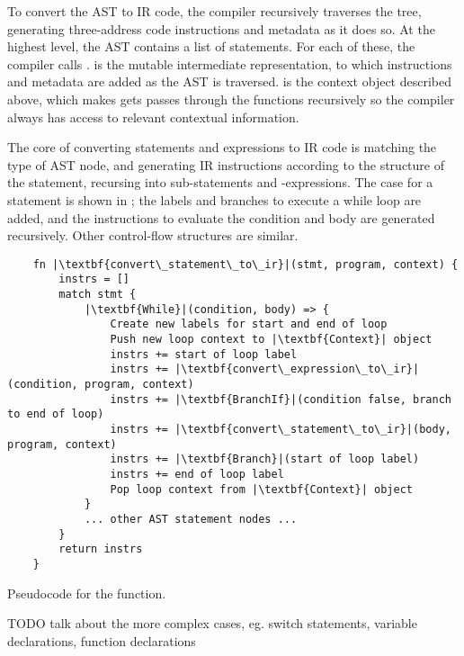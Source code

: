 \documentclass[00-main.tex]{subfiles}
\begin{document}
To convert the AST to IR code, the compiler recursively traverses the tree, generating three-address code instructions and metadata as it does so.
At the highest level, the AST contains a list of statements.
For each of these, the compiler calls .
 is the mutable intermediate representation, to which instructions and metadata are added as the AST is traversed.
 is the context object described above, which makes gets passes through the functions recursively so the compiler always has access to relevant contextual information.

The core of converting statements and expressions to IR code is matching the type of AST node, and generating IR instructions according to the structure of the statement, recursing into sub-statements and -expressions.
The case for a  statement is shown in ; the labels and branches to execute a while loop are added, and the instructions to evaluate the condition and body are generated recursively.
Other control-flow structures are similar.

\begin{listing}[!ht]
  \begin{verbatim}
    fn |\textbf{convert\_statement\_to\_ir}|(stmt, program, context) {
        instrs = []
        match stmt {
            |\textbf{While}|(condition, body) => {
                Create new labels for start and end of loop
                Push new loop context to |\textbf{Context}| object
                instrs += start of loop label
                instrs += |\textbf{convert\_expression\_to\_ir}|(condition, program, context)
                instrs += |\textbf{BranchIf}|(condition false, branch to end of loop)
                instrs += |\textbf{convert\_statement\_to\_ir}|(body, program, context)
                instrs += |\textbf{Branch}|(start of loop label)
                instrs += end of loop label
                Pop loop context from |\textbf{Context}| object
            }
            ... other AST statement nodes ...
        }
        return instrs
    }
  \end{verbatim}
  \caption{Pseudocode for the  function.}
  \label{lst:convert while stmt to IR pseudocode}
\end{listing}

\begin{Comment}
TODO talk about the more complex cases, eg. switch statements, variable declarations, function declarations
\end{Comment}
\end{document}
